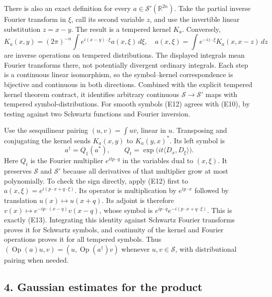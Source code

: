 \documentclass[
  11pt,
]{article}
\begin{document}
There is also an exact definition for every
\(a\in\mathcal S'(\mathbb R^{2n})\). Take the partial inverse Fourier
transform in \(\xi\), call its second variable \(z\), and use the
invertible linear substitution \(z=x-y\). The result is a tempered
kernel \(K_a\). Conversely, \[
K_a(x,y)=(2\pi)^{-n}\int e^{i(x-y)\cdot\xi}a(x,\xi)\,d\xi,
\quad
a(x,\xi)=\int e^{-iz\cdot\xi}K_a(x,x-z)\,dz
\tag{E12}
\] are inverse operations on tempered distributions. The displayed
integrals mean Fourier transforms there, not potentially divergent
ordinary integrals. Each step is a continuous linear isomorphism, so the
symbol--kernel correspondence is bijective and continuous in both
directions. Combined with the explicit tempered kernel theorem contract,
it identifies arbitrary continuous \(\mathcal S\to\mathcal S'\) maps
with tempered symbol-distributions. For smooth symbols (E12) agrees with
(E10), by testing against two Schwartz functions and Fourier inversion.

Use the sesquilinear pairing \((u,v)=\int u\overline v\), linear in
\(u\). Transposing and conjugating the kernel sends \(K_a(x,y)\) to
\(K_a(y,x)^*\). Its left symbol is \[
a^\dagger=Q_1(a^*),\qquad
Q_t=\exp\bigl(it\langle D_x,D_\xi\rangle\bigr).
\tag{E13}
\] Here \(Q_t\) is the Fourier multiplier \(e^{itp\cdot q}\) in the
variables dual to \((x,\xi)\). It preserves \(\mathcal S\) and
\(\mathcal S'\) because all derivatives of that multiplier grow at most
polynomially. To check the sign directly, apply (E12) first to
\(a(x,\xi)=e^{i(p\cdot x+q\cdot\xi)}\). Its operator is multiplication
by \(e^{ip\cdot x}\) followed by translation \(u(x)\mapsto u(x+q)\). Its
adjoint is therefore \(v(x)\mapsto e^{-ip\cdot(x-q)}v(x-q)\), whose
symbol is \(e^{ip\cdot q}e^{-i(p\cdot x+q\cdot\xi)}\). This is exactly
(E13). Integrating this identity against Schwartz Fourier transforms
proves it for Schwartz symbols, and continuity of the kernel and Fourier
operations proves it for all tempered symbols. Thus
\((\operatorname{Op}(a)u,v)=(u,\operatorname{Op}(a^\dagger)v)\) whenever
\(u,v\in\mathcal S\), with distributional pairing when needed.

\subsection{4. Gaussian estimates for the
product}\label{gaussian-estimates-for-the-product}
\end{document}
